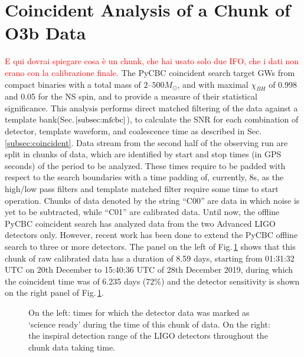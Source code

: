 \documentclass[binding=0.6cm, LaM]{sapthesis}
\newcommand{\fpg}[1]{\textcolor{red}{#1} }
\begin{document}
\section{Coincident Analysis of a Chunk of O3b Data}
\label{sec:pycbc00}
\fpg{E qui dovrai spiegare cosa \`e un chunk, che hai usato solo due IFO, che i dati non erano con la calibrazione finale.}
	The PyCBC coincident search target GWs from compact binaries with a total mass of $2–500M_\odot$,
        and with maximal $\chi_{BH}$ of 0.998 and 0.05 for the NS spin,
        and to provide a measure of their statistical significance.
        This analysis performs direct matched filtering of the data against a template bank(Sec.$\ref{subsec:mfcbc}$),
        to calculate the SNR for each combination of detector, template waveform, and coalescence time as described in Sec.\,\ref{subsec:coincident}.
	Data stream from the second half of the observing run are split in chunks of data,
	which are identified by start and stop times (in GPS seconds) of the period to be analyzed.
	These times require to be padded with respect to the search boundaries with a time padding of, currently, 8s, 	
	as the high/low pass filters and template matched filter require some time to start operation.
	Chunks of data denoted by the string “C00” are data in which noise is yet to be subtracted,
	while “C01” are calibrated data.
	Until now, the offline PyCBC coincident search has analyzed data from the two Advanced LIGO detectors only. 
	However, recent work \cite{207} has been done  to extend the PyCBC offline search to three or more detectors.
	The panel on the left of Fig.\,\ref{fig:range_time} shows that this chunk of raw calibrated data has a duration of 8.59 days,
        starting from 01:31:32 UTC on 20th December to 15:40:36 UTC of 28th December 2019,
        during which the coincident time was of 6.235 days (72\%) and the detector sensitivity is shown on the right panel of Fig.\,\ref{fig:range_time}.
 		\begin{figure}[h]
                        \noindent
                        \label{range_time}
                        \centering
                        \caption{On the left: times for which the detector data was marked as ‘science ready’ during the time of this chunk of data. On the right: the inspiral detection range of the LIGO detectors throughout the chunk data taking time.}
                        \label{fig:range_time}
                \end{figure}
\end{document}
